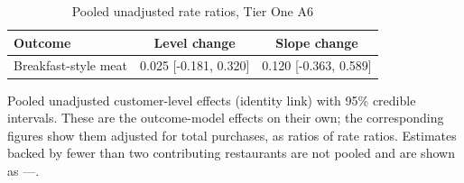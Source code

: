 \begin{table}[H]
\centering
\caption{Pooled unadjusted rate ratios, Tier One A6}
\label{tab:a6_mu_gamma}
\begin{tabular}{lcc}
\toprule
Outcome & Level change & Slope change \\
\midrule
Breakfast-style meat & 0.025 [-0.181, 0.320] & 0.120 [-0.363, 0.589] \\
\bottomrule
\end{tabular}
\par\smallskip\footnotesize Pooled unadjusted customer-level effects (identity link) with 95\% credible intervals. These are the outcome-model effects on their own; the corresponding figures show them adjusted for total purchases, as ratios of rate ratios. Estimates backed by fewer than two contributing restaurants are not pooled and are shown as ---.
\end{table}
